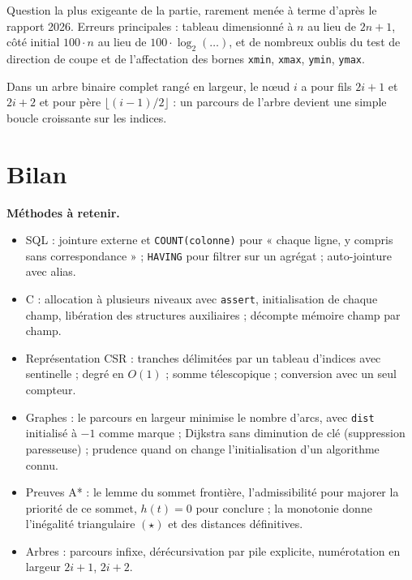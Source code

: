 \documentclass[11pt,a4paper]{article}
\providecommand{\tightlist}{\setlength{\itemsep}{0pt}\setlength{\parskip}{0pt}}
\begin{document}
\begin{jury}

Question la plus exigeante de la partie, rarement menée à terme d'après le rapport 2026. Erreurs principales : tableau dimensionné à \(n\) au lieu de \(2n + 1\), côté initial \(100 \cdot n\) au lieu de \(100 \cdot \log_2(\dots)\), et de nombreux oublis du test de direction de coupe et de l'affectation des bornes \texttt{xmin}, \texttt{xmax}, \texttt{ymin}, \texttt{ymax}.

\end{jury}

\begin{methode}

Dans un arbre binaire complet rangé en largeur, le nœud \(i\) a pour fils \(2i+1\) et \(2i+2\) et pour père \(\lfloor (i-1)/2 \rfloor\) : un parcours de l'arbre devient une simple boucle croissante sur les indices.

\end{methode}

\hypertarget{bilan}{%
\section{Bilan}\label{bilan}}

\textbf{Méthodes à retenir.}

\begin{itemize}
\tightlist
\item
  SQL : jointure externe et \texttt{COUNT(colonne)} pour « chaque ligne, y compris sans correspondance » ; \texttt{HAVING} pour filtrer sur un agrégat ; auto-jointure avec alias.
\item
  C : allocation à plusieurs niveaux avec \texttt{assert}, initialisation de chaque champ, libération des structures auxiliaires ; décompte mémoire champ par champ.
\item
  Représentation CSR : tranches délimitées par un tableau d'indices avec sentinelle ; degré en \(O(1)\) ; somme télescopique ; conversion avec un seul compteur.
\item
  Graphes : le parcours en largeur minimise le nombre d'arcs, avec \texttt{dist} initialisé à \(-1\) comme marque ; Dijkstra sans diminution de clé (suppression paresseuse) ; prudence quand on change l'initialisation d'un algorithme connu.
\item
  Preuves A* : le lemme du sommet frontière, l'admissibilité pour majorer la priorité de ce sommet, \(h(t) = 0\) pour conclure ; la monotonie donne l'inégalité triangulaire \((\star)\) et des distances définitives.
\item
  Arbres : parcours infixe, dérécursivation par pile explicite, numérotation en largeur \(2i+1\), \(2i+2\).
\end{itemize}
\end{document}
